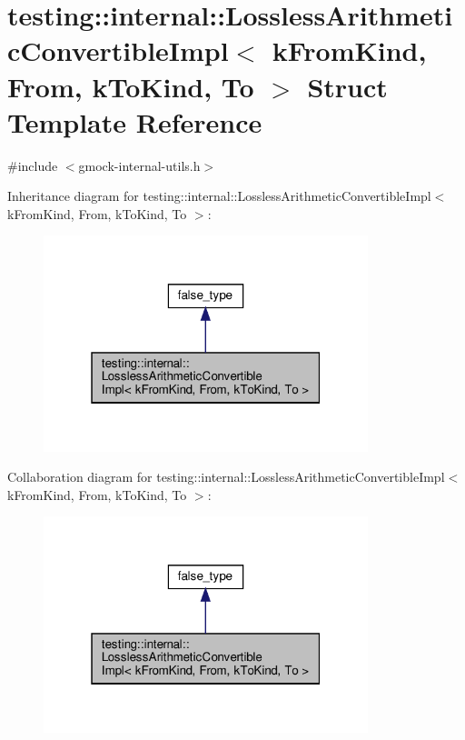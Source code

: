 \hypertarget{structtesting_1_1internal_1_1_lossless_arithmetic_convertible_impl}{}\section{testing\+:\+:internal\+:\+:Lossless\+Arithmetic\+Convertible\+Impl$<$ k\+From\+Kind, From, k\+To\+Kind, To $>$ Struct Template Reference}
\label{structtesting_1_1internal_1_1_lossless_arithmetic_convertible_impl}


{\ttfamily \#include $<$gmock-\/internal-\/utils.\+h$>$}



Inheritance diagram for testing\+:\+:internal\+:\+:Lossless\+Arithmetic\+Convertible\+Impl$<$ k\+From\+Kind, From, k\+To\+Kind, To $>$\+:
\nopagebreak
\begin{figure}[H]
\begin{center}
\leavevmode
\includegraphics[width=268pt]{structtesting_1_1internal_1_1_lossless_arithmetic_convertible_impl__inherit__graph}
\end{center}
\end{figure}


Collaboration diagram for testing\+:\+:internal\+:\+:Lossless\+Arithmetic\+Convertible\+Impl$<$ k\+From\+Kind, From, k\+To\+Kind, To $>$\+:
\nopagebreak
\begin{figure}[H]
\begin{center}
\leavevmode
\includegraphics[width=268pt]{structtesting_1_1internal_1_1_lossless_arithmetic_convertible_impl__coll__graph}
\end{center}
\end{figure}
